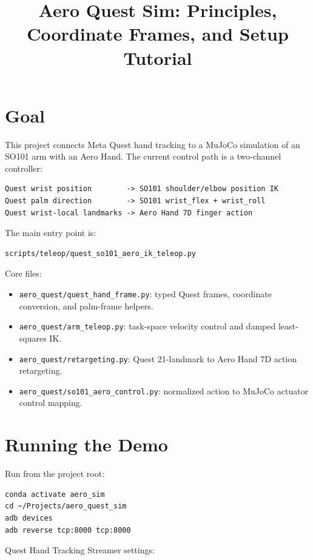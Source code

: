 \documentclass[11pt]{article}
\title{Aero Quest Sim: Principles, Coordinate Frames, and Setup Tutorial}
\author{}
\date{}
\begin{document}
\maketitle

\section{Goal}

This project connects Meta Quest hand tracking to a MuJoCo simulation of an
SO101 arm with an Aero Hand. The current control path is a two-channel
controller:

\begin{lstlisting}
Quest wrist position        -> SO101 shoulder/elbow position IK
Quest palm direction        -> SO101 wrist_flex + wrist_roll
Quest wrist-local landmarks -> Aero Hand 7D finger action
\end{lstlisting}

The main entry point is:

\begin{lstlisting}
scripts/teleop/quest_so101_aero_ik_teleop.py
\end{lstlisting}

Core files:

\begin{itemize}
  \item \texttt{aero\_quest/quest\_hand\_frame.py}: typed Quest frames, coordinate conversion, and palm-frame helpers.
  \item \texttt{aero\_quest/arm\_teleop.py}: task-space velocity control and damped least-squares IK.
  \item \texttt{aero\_quest/retargeting.py}: Quest 21-landmark to Aero Hand 7D action retargeting.
  \item \texttt{aero\_quest/so101\_aero\_control.py}: normalized action to MuJoCo actuator control mapping.
\end{itemize}

\section{Running the Demo}

Run from the project root:

\begin{lstlisting}
conda activate aero_sim
cd ~/Projects/aero_quest_sim
adb devices
adb reverse tcp:8000 tcp:8000
\end{lstlisting}

Quest Hand Tracking Streamer settings:
\end{document}
